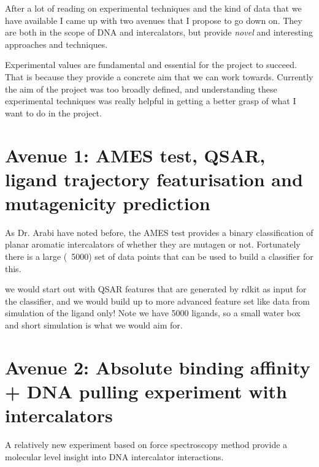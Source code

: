 \documentclass{article}
\begin{document}
  
After a lot of reading on experimental techniques and the kind of data that we have available I came up with two avenues that I propose to go down on. They are both in the scope of DNA and intercalators, but provide \emph{novel} and interesting approaches and techniques.

Experimental values are fundamental and essential for the project to succeed. That is because they provide a concrete aim that we can work towards. Currently the aim of the project was too broadly defined, and understanding these experimental techniques was really helpful in getting a better grasp of what I want to do in the project.

\section{Avenue 1: AMES test, QSAR, ligand trajectory featurisation and mutagenicity prediction}

As Dr. Arabi have noted before, the AMES test provides a binary classification of planar aromatic intercalators of whether they are mutagen or not. Fortunately there is a large (~5000) set of data points that can be used to build a classifier for this.

we would start out with QSAR features that are generated by rdkit as input for the classifier, and we would build up to more advanced feature set like data from simulation of the ligand only! Note we have 5000 ligands, so a small water box and short simulation is what we would aim for.

\section{Avenue 2: Absolute binding affinity + DNA pulling experiment with intercalators}

A relatively new experiment based on force spectroscopy method provide a molecular level insight into DNA intercalator interactions. 
  
\end{document}
